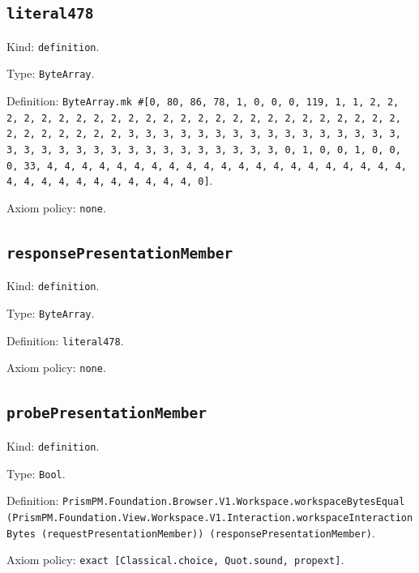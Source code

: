 \documentclass[11pt]{article}
\begin{document}
\subsection*{\texttt{literal478}}
\noindent Kind: \texttt{definition}.\par
\noindent Type: \texttt{ByteArray}.\par
\noindent Definition: \texttt{ByteArray.mk \#[0, 80, 86, 78, 1, 0, 0, 0, 119, 1, 1, 2, 2, 2, 2, 2, 2, 2, 2, 2, 2, 2, 2, 2, 2, 2, 2, 2, 2, 2, 2, 2, 2, 2, 2, 2, 2, 2, 2, 2, 2, 2, 2, 3, 3, 3, 3, 3, 3, 3, 3, 3, 3, 3, 3, 3, 3, 3, 3, 3, 3, 3, 3, 3, 3, 3, 3, 3, 3, 3, 3, 3, 3, 3, 3, 0, 1, 0, 0, 1, 0, 0, 0, 33, 4, 4, 4, 4, 4, 4, 4, 4, 4, 4, 4, 4, 4, 4, 4, 4, 4, 4, 4, 4, 4, 4, 4, 4, 4, 4, 4, 4, 4, 4, 4, 4, 0]}.\par
\noindent Axiom policy: \texttt{none}.\par
\subsection*{\texttt{responsePresentationMember}}
\noindent Kind: \texttt{definition}.\par
\noindent Type: \texttt{ByteArray}.\par
\noindent Definition: \texttt{literal478}.\par
\noindent Axiom policy: \texttt{none}.\par
\subsection*{\texttt{probePresentationMember}}
\noindent Kind: \texttt{definition}.\par
\noindent Type: \texttt{Bool}.\par
\noindent Definition: \texttt{PrismPM.Foundation.Browser.V1.Workspace.workspaceBytesEqual (PrismPM.Foundation.View.Workspace.V1.Interaction.workspaceInteractionBytes (requestPresentationMember)) (responsePresentationMember)}.\par
\noindent Axiom policy: \texttt{exact [Classical.choice, Quot.sound, propext]}.\par
\end{document}
